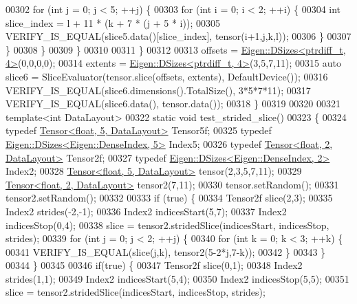 \begin{DoxyCode}
00302         \textcolor{keywordflow}{for} (\textcolor{keywordtype}{int} j = 0; j < 5; ++j) \{
00303           \textcolor{keywordflow}{for} (\textcolor{keywordtype}{int} i = 0; i < 2; ++i) \{
00304             \textcolor{keywordtype}{int} slice\_index = l + 11 * (k + 7 * (j + 5 * i));
00305             VERIFY\_IS\_EQUAL(slice5.data()[slice\_index], tensor(i+1,j,k,l));
00306           \}
00307         \}
00308       \}
00309     \}
00310 
00311   \}
00312 
00313   offsets = \hyperlink{struct_eigen_1_1_d_sizes}{Eigen::DSizes<ptrdiff\_t, 4>}(0,0,0,0);
00314   extents = \hyperlink{struct_eigen_1_1_d_sizes}{Eigen::DSizes<ptrdiff\_t, 4>}(3,5,7,11);
00315   \textcolor{keyword}{auto} slice6 = SliceEvaluator(tensor.slice(offsets, extents), DefaultDevice());
00316   VERIFY\_IS\_EQUAL(slice6.dimensions().TotalSize(), 3*5*7*11);
00317   VERIFY\_IS\_EQUAL(slice6.data(), tensor.data());
00318 \}
00319 
00320 
00321 \textcolor{keyword}{template}<\textcolor{keywordtype}{int} DataLayout>
00322 \textcolor{keyword}{static} \textcolor{keywordtype}{void} test\_strided\_slice()
00323 \{
00324   \textcolor{keyword}{typedef} \hyperlink{class_eigen_1_1_tensor}{Tensor<float, 5, DataLayout>} Tensor5f;
00325   \textcolor{keyword}{typedef} \hyperlink{struct_eigen_1_1_d_sizes}{Eigen::DSizes<Eigen::DenseIndex, 5>} Index5;
00326   \textcolor{keyword}{typedef} \hyperlink{class_eigen_1_1_tensor}{Tensor<float, 2, DataLayout>} Tensor2f;
00327   \textcolor{keyword}{typedef} \hyperlink{struct_eigen_1_1_d_sizes}{Eigen::DSizes<Eigen::DenseIndex, 2>} Index2;
00328   \hyperlink{class_eigen_1_1_tensor}{Tensor<float, 5, DataLayout>} tensor(2,3,5,7,11);
00329   \hyperlink{class_eigen_1_1_tensor}{Tensor<float, 2, DataLayout>} tensor2(7,11);
00330   tensor.setRandom();
00331   tensor2.setRandom();
00332 
00333   \textcolor{keywordflow}{if} (\textcolor{keyword}{true}) \{
00334     Tensor2f slice(2,3);
00335     Index2 strides(-2,-1);
00336     Index2 indicesStart(5,7);
00337     Index2 indicesStop(0,4);
00338     slice = tensor2.stridedSlice(indicesStart, indicesStop, strides);
00339     \textcolor{keywordflow}{for} (\textcolor{keywordtype}{int} j = 0; j < 2; ++j) \{
00340       \textcolor{keywordflow}{for} (\textcolor{keywordtype}{int} k = 0; k < 3; ++k) \{
00341         VERIFY\_IS\_EQUAL(slice(j,k), tensor2(5-2*j,7-k));
00342       \}
00343     \}
00344   \}
00345 
00346   \textcolor{keywordflow}{if}(\textcolor{keyword}{true}) \{
00347     Tensor2f slice(0,1);
00348     Index2 strides(1,1);
00349     Index2 indicesStart(5,4);
00350     Index2 indicesStop(5,5);
00351     slice = tensor2.stridedSlice(indicesStart, indicesStop, strides);

\end{DoxyCode}
